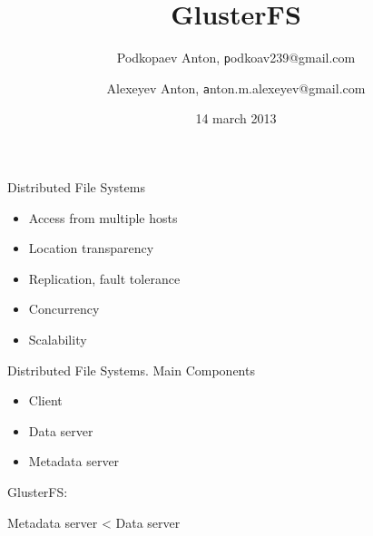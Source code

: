\documentclass{beamer}
\begin{document}
\title
[GlusterFS]
{GlusterFS}
\author
[Podkopaev Anton, Alexeyev Anton]
{
Podkopaev Anton, \texttt podkoav239@gmail.com\\
\and
Alexeyev Anton, \texttt anton.m.alexeyev@gmail.com
}
\date [14-03-13]{14 march 2013}

\begin{frame}[plain]
	\titlepage
\end{frame}

\begin{frame}{Distributed File Systems}
	\begin{itemize}
		\item Access from multiple hosts
		
		\item Location transparency
		
		\item Replication, fault tolerance
		
		\item Concurrency
		
		\item Scalability

	\end{itemize}
\end{frame}

\begin{frame}{Distributed File Systems. Main Components}
	\begin{itemize}
		\item Client
		\item Data server
		\item Metadata server
	\end{itemize}
	\pause
	GlusterFS:

	Metadata server < Data server
\end{frame}
\end{document}
